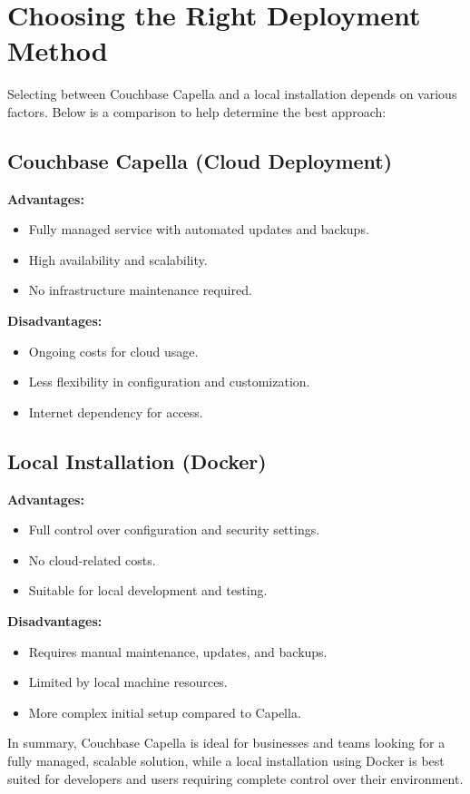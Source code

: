 \section{Choosing the Right Deployment Method}
Selecting between Couchbase Capella and a local installation depends on various factors. Below is a comparison to help determine the best approach:

\subsection{Couchbase Capella (Cloud Deployment)}
\textbf{Advantages:}
\begin{itemize}
  \item Fully managed service with automated updates and backups.
  \item High availability and scalability.
  \item No infrastructure maintenance required.
\end{itemize}

\textbf{Disadvantages:}
\begin{itemize}
  \item Ongoing costs for cloud usage.
  \item Less flexibility in configuration and customization.
  \item Internet dependency for access.
\end{itemize}

\subsection{Local Installation (Docker)}
\textbf{Advantages:}
\begin{itemize}
  \item Full control over configuration and security settings.
  \item No cloud-related costs.
  \item Suitable for local development and testing.
\end{itemize}

\textbf{Disadvantages:}
\begin{itemize}
  \item Requires manual maintenance, updates, and backups.
  \item Limited by local machine resources.
  \item More complex initial setup compared to Capella.
\end{itemize}

In summary, Couchbase Capella is ideal for businesses and teams looking for a fully managed, scalable solution, while a local installation using Docker is best suited for developers and users requiring complete control over their environment.